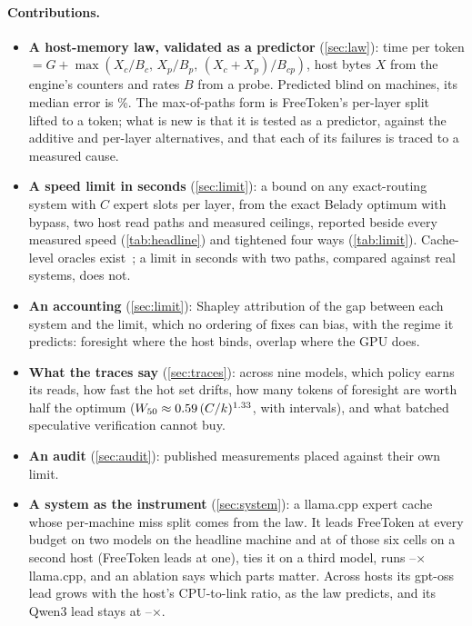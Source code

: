\documentclass[10pt,twocolumn]{article}
\begin{document}
\paragraph{Contributions.}
\begin{itemize}\setlength\itemsep{1pt}
\item \textbf{A host-memory law, validated as a predictor} (\cref{sec:law}): time per token
$=G+\max(X_c/B_c,\,X_p/B_p,\,(X_c{+}X_p)/B_{cp})$, host bytes $X$ from the engine's counters and rates $B$ from a
probe. Predicted blind on \lawHosts{} machines, its median error is \lawMedian\%. The max-of-paths form is
FreeToken's per-layer split~\cite{freetoken} lifted to a token; what is new is that it is tested as a predictor,
against the additive and per-layer alternatives, and that each of its failures is traced to a measured cause.
\item \textbf{A speed limit in seconds} (\cref{sec:limit}): a bound on any exact-routing system with $C$ expert slots
per layer, from the exact Belady optimum with bypass, two host read paths and measured ceilings, reported beside every
measured speed (\cref{tab:headline}) and tightened four ways (\cref{tab:limit}). Cache-level oracles
exist~\cite{zhang2026reproducible}; a limit in seconds with two paths, compared against real systems, does not.
\item \textbf{An accounting} (\cref{sec:limit}): Shapley attribution of the gap between each system and the limit,
which no ordering of fixes can bias, with the regime it predicts: foresight where the host binds, overlap where the GPU does.
\item \textbf{What the traces say} (\cref{sec:traces}): across nine models, which policy earns its reads, how fast
the hot set drifts, how many tokens of foresight are worth half the optimum ($W_{50}\approx0.59\,(C/k)^{1.33}$,
with intervals), and what batched speculative verification cannot buy.
\item \textbf{An audit} (\cref{sec:audit}): \audAllN{} published measurements placed against their own limit.
\item \textbf{A system as the instrument} (\cref{sec:system}): a llama.cpp expert cache whose per-machine miss split
comes from the law. It leads FreeToken at every budget on two models on the headline machine and at
\scOursLeadCells{} of those six cells on a second host (FreeToken leads at one), ties it on a third model, runs
\llamaXMin--\llamaXMax$\times$ llama.cpp, and an ablation says which parts matter. Across \ratioHostsN{} hosts its
gpt-oss lead grows with the host's CPU-to-link ratio, as the law predicts, and its Qwen3 lead stays at
\ratioQwenLo--\ratioQwenHi$\times$.
\end{itemize}
\end{document}
